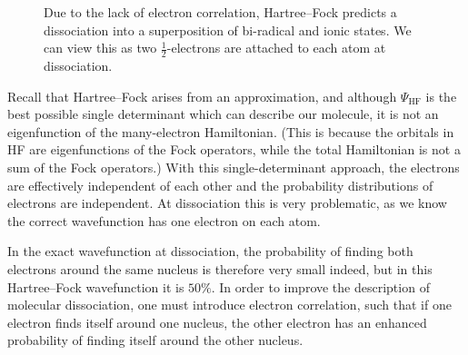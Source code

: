\documentclass{article}
\theoremstyle{plain}\theoremheaderfont{\normalfont\itshape}\theorembodyfont{\rmfamily}\theoremseparator{.}\newtheorem*{rem}{Remark}\newtheorem*{ex}{Example}\newtheorem*{proof}{Proof}\newtheorem*{altp}{Alternative proof}
\theoremstyle{plain}\theoremheaderfont{\normalfont\bfseries}\theorembodyfont{\rmfamily}\theoremseparator{.}\newtheorem{thm}{Theorem}[section]\newtheorem{lem}[thm]{Lemma}\newtheorem{prop}[thm]{Proposition}\newtheorem*{cor}{Corollary}\newtheorem{defn}[thm]{Definition}\newtheorem{clm}[thm]{Claim}\newtheorem{clminproof}{Claim}\newtheorem{pos}{Postulate}[section]
\theoremstyle{break}\theoremheaderfont{\normalfont\itshape}\theorembodyfont{\rmfamily}\theoremseparator{.\medskip}\newtheorem*{proofskip}{Proof}\newtheorem*{exs}{Examples}\newtheorem*{rems}{Remarks}
\theoremstyle{break}\theoremheaderfont{\normalfont\bfseries}\theorembodyfont{\rmfamily}\theoremseparator{.\medskip}\newtheorem{lemskip}[thm]{Lemma}\newtheorem{defnskip}[thm]{Definition}\newtheorem{propskip}[thm]{Proposition}\newtheorem{thmskip}[thm]{Theorem}
\numberwithin{equation}{section}
\newcommand{\vdot}{\,\bm{\mathrm{\cdot}}\,}
\begin{document}
    \begin{figure}
        \centering
        \caption{Due to the lack of electron correlation, Hartree--Fock predicts a dissociation into a superposition of bi-radical and ionic states. We can view this as two \(\frac{1}{2}\)-electrons are attached to each atom at dissociation.}
    \end{figure}

    Recall that Hartree--Fock arises from an approximation, and although \(\Psi_{\text{HF}}\) is the best possible single determinant which can describe our molecule, it is not an eigenfunction of the many-electron Hamiltonian. (This is because the orbitals in HF are eigenfunctions of the Fock operators, while the total Hamiltonian is not a sum of the Fock operators.) With this single-determinant approach, the electrons are effectively independent of each other and the probability distributions of electrons are independent. At dissociation this is very problematic, as we know the correct wavefunction
    has one electron on each atom.

    In the exact wavefunction at dissociation, the probability of finding both electrons around the same nucleus is therefore very small indeed, but in this Hartree--Fock wavefunction it is \(50\%\). In order to improve the description of molecular dissociation, one must introduce electron correlation, such that if one electron finds itself around one nucleus, the other electron has an enhanced probability of finding itself around the other nucleus.
\end{document}
